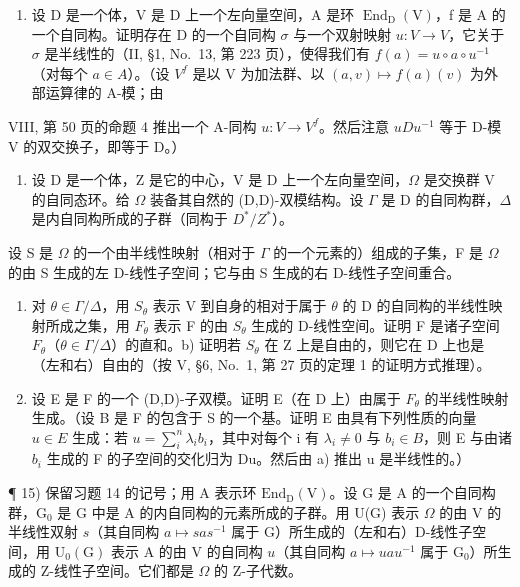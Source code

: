 \begin{enumerate}
\def\labelenumi{\arabic{enumi})}
\setcounter{enumi}{12}
\tightlist
\item
  设 D 是一个体，V 是 D 上一个左向量空间，A 是环 \(\operatorname{End}_{\mathrm{D}}(\mathrm{V})\)，f 是 A 的一个自同构。证明存在 D 的一个自同构 \(\sigma\) 与一个双射映射 \(u: V \to V\)，它关于 \(\sigma\) 是半线性的（II, §1, No.~13, 第 223 页），使得我们有 \(f(a) = u \circ a \circ u^{-1}\)（对每个 \(a \in A\)）。（设 \(V^{f}\) 是以 V 为加法群、以 \((a, v) \mapsto f(a)(v)\) 为外部运算律的 A-模；由
\end{enumerate}

VIII, 第 50 页的命题 4 推出一个 A-同构 \(u: V \to V^{f}\)。然后注意 \(uDu^{-1}\) 等于 D-模 V 的双交换子，即等于 D。）

\begin{enumerate}
\def\labelenumi{\arabic{enumi})}
\setcounter{enumi}{13}
\tightlist
\item
  设 D 是一个体，Z 是它的中心，V 是 D 上一个左向量空间，\(\Omega\) 是交换群 V 的自同态环。给 \(\Omega\) 装备其自然的 (D,D)-双模结构。设 \(\Gamma\) 是 D 的自同构群，\(\Delta\) 是内自同构所成的子群（同构于 \(D^{*}/Z^{*}\)）。
\end{enumerate}

设 S 是 \(\Omega\) 的一个由半线性映射（相对于 \(\Gamma\) 的一个元素的）组成的子集，F 是 \(\Omega\) 的由 S 生成的左 D-线性子空间；它与由 S 生成的右 D-线性子空间重合。

\begin{enumerate}
\def\labelenumi{\alph{enumi})}
\item
  对 \(\theta \in \Gamma / \Delta\)，用 \(S_{\theta}\) 表示 V 到自身的相对于属于 \(\theta\) 的 D 的自同构的半线性映射所成之集，用 \(F_{\theta}\) 表示 F 的由 \(S_{\theta}\) 生成的 D-线性空间。证明 F 是诸子空间 \(F_{\theta}\)（\(\theta \in \Gamma / \Delta\)）的直和。b) 证明若 \(S_{\theta}\) 在 Z 上是自由的，则它在 D 上也是（左和右）自由的（按 V, §6, No.~1, 第 27 页的定理 1 的证明方式推理）。
\item
  设 E 是 F 的一个 (D,D)-子双模。证明 E（在 D 上）由属于 \(F_{\theta}\) 的半线性映射生成。（设 B 是 F 的包含于 S 的一个基。证明 E 由具有下列性质的向量 \(u \in E\) 生成：若 \(u = \sum_{i}^{n} \lambda_{i} b_{i}\)，其中对每个 i 有 \(\lambda_{i} \neq 0\) 与 \(b_{i} \in B\)，则 E 与由诸 \(b_{i}\) 生成的 F 的子空间的交化归为 Du。然后由 a) 推出 u 是半线性的。）
\end{enumerate}

¶ 15) 保留习题 14 的记号；用 A 表示环 \(\mathrm{End}_{\mathrm{D}}(\mathrm{V})\)。设 G 是 A 的一个自同构群，\(\mathrm{G}_0\) 是 G 中是 A 的内自同构的元素所成的子群。用 U(G) 表示 \(\Omega\) 的由 V 的半线性双射 \(s\)（其自同构 \(a \mapsto sas^{-1}\) 属于 G）所生成的（左和右）D-线性子空间，用 \(\mathrm{U}_0(\mathrm{G})\) 表示 A 的由 V 的自同构 \(u\)（其自同构 \(a \mapsto uau^{-1}\) 属于 \(\mathrm{G}_0\)）所生成的 Z-线性子空间。它们都是 \(\Omega\) 的 Z-子代数。

